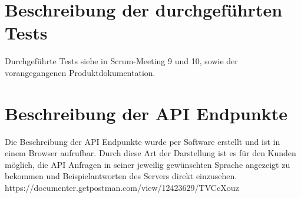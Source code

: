 \documentclass[a4paper,report,headsepline]{scrreprt}
\begin{document}
\chapter{Beschreibung der durchgeführten Tests}
Durchgeführte Tests siehe in Scrum-Meeting 9 und 10, sowie der vorangegangenen Produktdokumentation.
\chapter{Beschreibung der API Endpunkte}  
Die Beschreibung der API Endpunkte wurde per Software erstellt und ist in einem Browser aufrufbar. Durch diese Art der Darstellung ist es für den Kunden möglich, die API Anfragen in seiner jeweilig gewünschten Sprache angezeigt zu bekommen und Beispielantworten des Servers direkt einzusehen.\\
https://documenter.getpostman.com/view/12423629/TVCcXouz      
\end{document}
